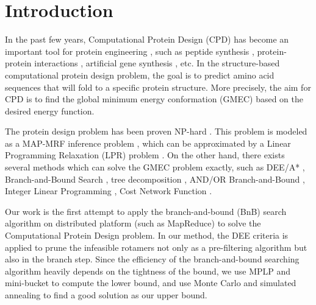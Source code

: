 \section{Introduction}
In the past few years, Computational Protein Design (CPD) has become an important tool for protein engineering \cite[]{alvizo2007computational}, such as peptide synthesis \cite[]{ottl1996design}, protein-protein interactions \cite[]{roberts2012computational}, artificial gene synthesis \cite[]{villalobos2006gene}, etc. In the structure-based computational protein design problem, the goal is to predict amino acid sequences that will fold to a specific protein structure. More precisely, the aim for CPD is to find the global minimum energy conformation (GMEC) based on the desired energy function.

The protein design problem has been proven NP-hard \cite[]{pierce2002protein}. This problem is modeled as a MAP-MRF inference problem \cite[]{yanover2006linear}, which can be approximated by a Linear Programming Relaxation (LPR) problem \cite[]{wainwright2005map}. On the other hand, there exists several methods which can solve the GMEC problem exactly, such as DEE/A* \cite[]{gainza2013osprey}, Branch-and-Bound Search \cite[]{hong2006protein}, tree decomposition \cite[]{xu2006fast}, AND/OR Branch-and-Bound \cite[]{marinescu2009and}, Integer Linear Programming \cite[]{kingsford2005solving}, Cost Network Function \cite[]{traore2013new}.

Our work is the first attempt to apply the branch-and-bound (BnB) search algorithm on distributed platform (such as MapReduce) to solve the Computational Protein Design problem. In our method, the DEE criteria is applied to prune the infeasible rotamers not only as a pre-filtering algorithm but also in the branch step. Since the efficiency of the branch-and-bound searching algorithm heavily depends on the tightness of the bound, we use MPLP \cite[]{globerson2008fixing} and mini-bucket \cite[]{rollon2010evaluating} to compute the lower bound, and use Monte Carlo and simulated annealing to find a good solution as our upper bound. 